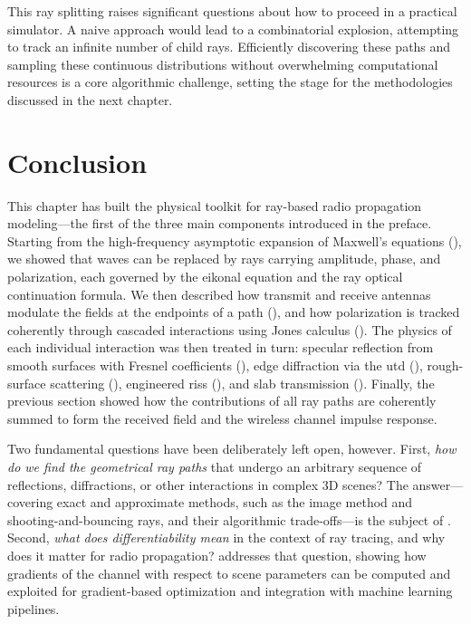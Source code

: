 This ray splitting raises significant questions about how to proceed in a practical simulator. A naive approach would lead to a combinatorial explosion, attempting to track an infinite number of child rays. Efficiently discovering these paths and sampling these continuous distributions without overwhelming computational resources is a core algorithmic challenge, setting the stage for the methodologies discussed in the next chapter.

\section{Conclusion}

This chapter has built the physical toolkit for ray-based radio propagation modeling---the first of the three main components introduced in the preface. Starting from the high-frequency asymptotic expansion of Maxwell's equations (), we showed that waves can be replaced by rays carrying amplitude, phase, and polarization, each governed by the eikonal equation and the ray optical continuation formula. We then described how transmit and receive antennas modulate the fields at the endpoints of a path (), and how polarization is tracked coherently through cascaded interactions using Jones calculus (). The physics of each individual interaction was then treated in turn: specular reflection from smooth surfaces with Fresnel coefficients (), edge diffraction via the \gls{utd} (), rough-surface scattering (), engineered \glspl{ris} (), and slab transmission (). Finally, the previous section showed how the contributions of all ray paths are coherently summed to form the received field and the wireless channel impulse response.

Two fundamental questions have been deliberately left open, however. First, \emph{how do we find the geometrical ray paths} that undergo an arbitrary sequence of reflections, diffractions, or other interactions in complex 3D scenes? The answer---covering exact and approximate methods, such as the image method and shooting-and-bouncing rays, and their algorithmic trade-offs---is the subject of . Second, \emph{what does differentiability mean} in the context of ray tracing, and why does it matter for radio propagation?  addresses that question, showing how gradients of the channel with respect to scene parameters can be computed and exploited for gradient-based optimization and integration with machine learning pipelines.
